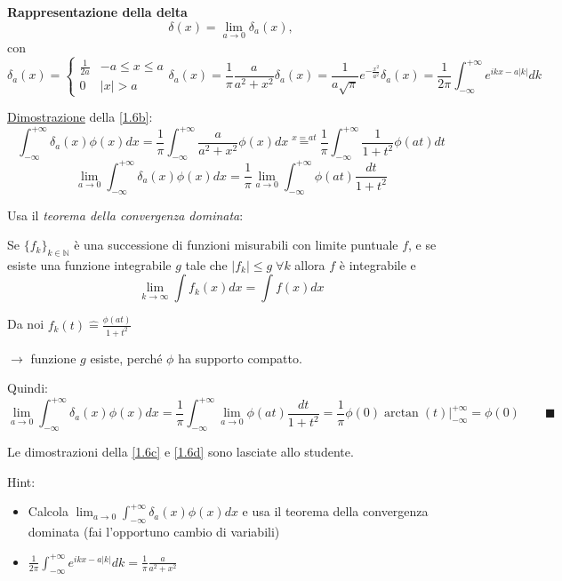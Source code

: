\documentclass[a4paper,11pt]{report}
\begin{document}
\textbf{Rappresentazione della delta}
\[
\delta(x) = \lim_{a\to 0} \delta_a(x),
\]
con 
\begin{subequations}
\begin{equation}
\delta_a(x)=\begin{cases}
\frac{1}{2a} & -a \leq x \leq a \\
0 & |x| > a
\end{cases}
\label{1.6a}
\end{equation}
\begin{equation}
\delta_a(x) = \frac{1}{\pi}\frac{a}{a^2+x^2}
\label{1.6b}
\end{equation}
\begin{equation}
\delta_a(x) = \frac{1}{a\sqrt{\pi}} e^{-\frac{x^2}{a^2}}
\label{1.6c}
\end{equation}
\begin{equation}
\delta_a(x) = \frac{1}{2\pi} \int_{-\infty}^{+\infty} e^{ikx-a|k|}dk
\label{1.6d}
\end{equation}
\end{subequations}

\underline{Dimostrazione} della \eqref{1.6b}:
\[
\int_{-\infty}^{+\infty} \delta_a(x)\phi(x)dx=\frac{1}{\pi}\int_{-\infty}^{+\infty}\frac{a}{a^2+x^2}\phi(x)dx \overset{x=at}{=} \frac{1}{\pi}\int_{-\infty}^{+\infty}\frac{1}{1+t^2}\phi(at)dt
\]
\[
\lim_{a\to 0} \int_{-\infty}^{+\infty}\delta_a(x)\phi(x)dx=\frac{1}{\pi}\lim_{a\to 0}\int_{-\infty}^{+\infty}\phi(at)\frac{dt}{1+t^2}
\]

Usa il \emph{teorema della convergenza dominata}:

Se $\{f_k\}_{k\in\mathbb{N}}$ \`e una successione di funzioni misurabili con limite puntuale $f$, e se esiste una funzione integrabile $g$ tale che $|f_k|\leq g \; \forall k$ allora $f$ \`e integrabile e
\[
\lim_{k\to \infty}\int f_k(x) dx = \int f(x) dx
\]

Da noi $f_k(t)\hat{=}\frac{\phi(at)}{1+t^2}$

$\rightarrow$ funzione $g$ esiste, perch\'e $\phi$ ha supporto compatto.

Quindi:
\[
\lim_{a\to 0}\int_{-\infty}^{+\infty}\delta_a(x)\phi(x)dx=\frac{1}{\pi}\int_{-\infty}^{+\infty} \lim_{a\to 0} \phi(at) \frac{dt}{1+t^2}=\frac{1}{\pi} \phi(0) \arctan{(t)}\Big|_{-\infty}^{+\infty}=\phi(0) \qquad \blacksquare
\]

Le dimostrazioni della \eqref{1.6c} e \eqref{1.6d} sono lasciate allo studente.

Hint:
\begin{itemize}
\item Calcola $\lim_{a\to 0}\int_{-\infty}^{+\infty}\delta_a(x)\phi(x)dx$ e usa il teorema della convergenza dominata (fai l'opportuno cambio di variabili)
\item $\frac{1}{2\pi}\int^{+\infty}_{-\infty} e^{ikx-a|k|}dk = \frac{1}{\pi}\frac{a}{a^2+x^2}$ 
\end{itemize}
\end{document}
